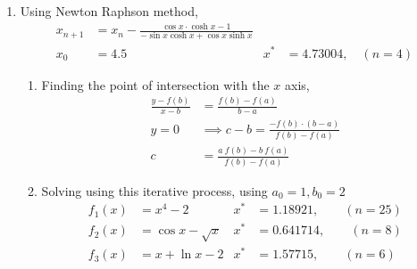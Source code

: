\begin{enumerate}
    \item Using Newton Raphson method,
          \begin{align}
              x_{n+1} & = x_n - \frac{\cos x \cdot \cosh x - 1}
              {-\sin x \cosh x + \cos x \sinh x}                  \\
              x_0     & = 4.5                                   &
              x^*     & = 4.73004,\quad (n=4)
          \end{align}
          \begin{figure}[H]
              \centering
          \end{figure}

          \begin{enumerate}
              \item Finding the point of intersection with the $ x $ axis,
                    \begin{align}
                        \frac{y - f(b)}{x - b} & = \frac{f(b) - f(a)}{b - a} \\
                        y = 0                  & \implies c - b =
                        \frac{-f(b) \cdot (b-a)}{f(b) - f(a)}                \\
                        c                      & = \frac{a\ f(b) - b\ f(a)}
                        {f(b) - f(a)}
                    \end{align}

              \item Solving using this iterative process, using
                    $ a_0 = 1, b_0 = 2 $
                    \begin{align}
                        f_1(x) & = x^4 - 2           & x^* & = 1.18921, \qquad (n=25) \\
                        f_2(x) & = \cos x - \sqrt{x} & x^* & = 0.641714, \qquad (n=8) \\
                        f_3(x) & = x + \ln x - 2     & x^* & = 1.57715, \qquad (n=6)
                    \end{align}
          \end{enumerate}


\end{enumerate}

